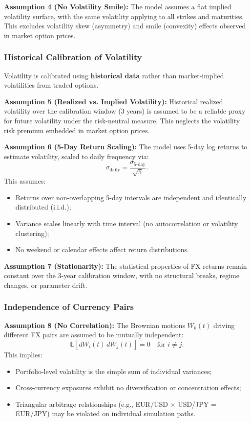 \textbf{Assumption 4 (No Volatility Smile):} The model assumes a flat implied volatility surface, with the same volatility applying to all strikes and maturities. This excludes volatility skew (asymmetry) and smile (convexity) effects observed in market option prices.

\subsubsection{Historical Calibration of Volatility}

Volatility is calibrated using \textbf{historical data} rather than market-implied volatilities from traded options.

\textbf{Assumption 5 (Realized vs. Implied Volatility):} Historical realized volatility over the calibration window (3 years) is assumed to be a reliable proxy for future volatility under the risk-neutral measure. This neglects the volatility risk premium embedded in market option prices.

\textbf{Assumption 6 (5-Day Return Scaling):} The model uses 5-day log returns to estimate volatility, scaled to daily frequency via:
\begin{equation}
	\sigma_{\text{daily}} = \frac{\sigma_{5\text{-day}}}{\sqrt{5}}.
\end{equation}
This assumes:
\begin{itemize}
	\item Returns over non-overlapping 5-day intervals are independent and identically distributed (i.i.d.);
	\item Variance scales linearly with time interval (no autocorrelation or volatility clustering);
	\item No weekend or calendar effects affect return distributions.
\end{itemize}

\textbf{Assumption 7 (Stationarity):} The statistical properties of FX returns remain constant over the 3-year calibration window, with no structural breaks, regime changes, or parameter drift.

\subsubsection{Independence of Currency Pairs}

\textbf{Assumption 8 (No Correlation):} The Brownian motions $W_k(t)$ driving different FX pairs are assumed to be mutually independent:
\begin{equation}
	\mathbb{E}[dW_i(t)\,dW_j(t)] = 0 \quad \text{for } i \neq j.
\end{equation}
This implies:
\begin{itemize}
	\item Portfolio-level volatility is the simple sum of individual variances;
	\item Cross-currency exposures exhibit no diversification or concentration effects;
	\item Triangular arbitrage relationships (e.g., EUR/USD $\times$ USD/JPY = EUR/JPY) may be violated on individual simulation paths.
\end{itemize}


